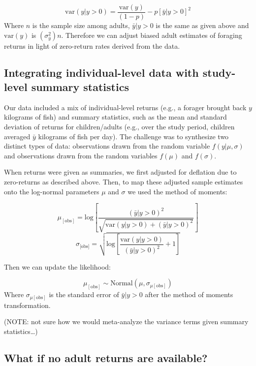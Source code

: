 \documentclass[
]{article}
\begin{document}
\[ \textrm{var}(y|y>0) = \frac{\textrm{var}(y)}{(1 - p)} - p[\bar{y}|y>0]^2 \]
Where \(n\) is the sample size among adults, \(\bar{y}|y>0\) is the same
as given above and \(\textrm{var}(y)\) is \((\sigma_{\bar{y}}^2)n\).
Therefore we can adjust biased adult estimates of foraging returns in
light of zero-return rates derived from the data.

\hypertarget{integrating-individual-level-data-with-study-level-summary-statistics}{%
\subsection{Integrating individual-level data with study-level summary
statistics}\label{integrating-individual-level-data-with-study-level-summary-statistics}}

Our data included a mix of individual-level returns (e.g., a forager
brought back \(y\) kilograms of fish) and summary statistics, such as
the mean and standard deviation of returns for children/adults (e.g.,
over the study period, children averaged \(\bar{y}\) kilograms of fish
per day). The challenge was to synthesize two distinct types of data:
observations drawn from the random variable \(f(y|\mu,\sigma)\) and
observations drawn from the random variables \(f(\mu)\) and
\(f(\sigma)\).

When returns were given as summaries, we first adjusted for deflation
due to zero-returns as described above. Then, to map these adjusted
sample estimates onto the log-normal parameters \(\mu\) and \(\sigma\)
we used the method of moments:

\[ \mu_{[\textrm{obs}]} = \textrm{log}[\frac{(\bar{y}|y>0)^2}{\sqrt{\textrm{var}(y|y>0) + (\bar{y}|y>0)^2}}]\]
\[ \sigma_{\textrm{[obs]}} = \sqrt{\textrm{log}[\frac{\textrm{var}(y|y>0)}{(\bar{y}|y>0)^2} + 1]}\]

Then we can update the likelihood:

\[ \mu_{[\textrm{obs}]} \sim \textrm{Normal}(\mu,\sigma_{\mu[\textrm{obs}]}) \]
Where \(\sigma_{\mu[\textrm{obs}]}\) is the standard error of
\(\bar{y}|y>0\) after the method of moments transformation.

(NOTE: not sure how we would meta-analyze the variance terms given
summary statistics\ldots)

\hypertarget{what-if-no-adult-returns-are-available}{%
\subsection{What if no adult returns are
available?}\label{what-if-no-adult-returns-are-available}}
\end{document}
